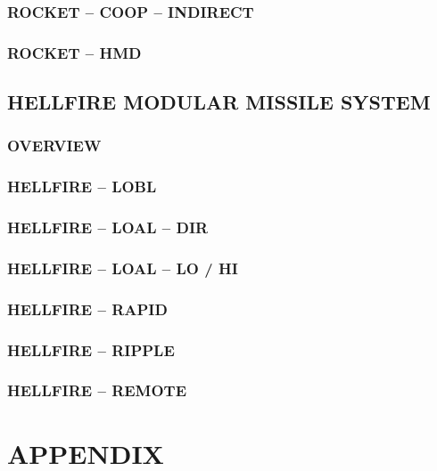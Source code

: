 \documentclass[fontHelvetica]{TechCheck}
\begin{document}
	\subsection{ROCKET -- COOP -- INDIRECT}
	\subsection{ROCKET -- HMD}

	\clearpage

	\section{HELLFIRE MODULAR MISSILE SYSTEM}
	\subsection{OVERVIEW}
	\subsection{HELLFIRE -- LOBL}
	\subsection{HELLFIRE -- LOAL -- DIR}
	\subsection{HELLFIRE -- LOAL -- LO / HI}
	\subsection{HELLFIRE -- RAPID}
	\subsection{HELLFIRE -- RIPPLE}
	\subsection{HELLFIRE -- REMOTE}

	\cleardoublepage

	\chapter{APPENDIX}
	\minitoc
	\cleardoublepage



  \cleardoublepage

\iftoggle{print}{
	\pagestyle{empty}
	\newpage \null
	\thumbwide
	\newpage \null
}{}
\end{document}
